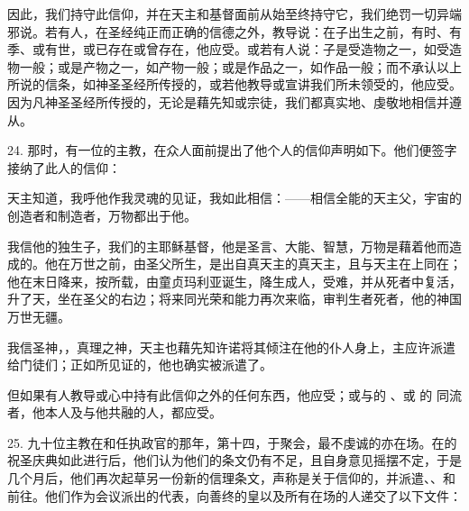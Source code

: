 因此，我们持守此信仰，并在天主和基督面前从始至终持守它，我们绝罚一切异端邪说。若有人，在圣经纯正而正确的信德之外，教导说：在子出生之前，有时、有季、或有世，或已存在或曾存在，他应受。或若有人说：子是受造物之一，如受造物一般；或是产物之一，如产物一般；或是作品之一，如作品一般；而不承认以上所说的信条，如神圣圣经所传授的，或若他教导或宣讲我们所未领受的，他应受。因为凡神圣圣经所传授的，无论是藉先知或宗徒，我们都真实地、虔敬地相信并遵从。\par

24. 那时，有一位的主教，在众人面前提出了他个人的信仰声明如下。他们便签字接纳了此人的信仰：\par

天主知道，我呼他作我灵魂的见证，我如此相信：——相信全能的天主父，宇宙的创造者和制造者，万物都出于他。\par

我信他的独生子，我们的主耶稣基督，他是圣言、大能、智慧，万物是藉着他而造成的。他在万世之前，由圣父所生，是出自真天主的真天主，且与天主在上同在；他在末日降来，按所载，由童贞玛利亚诞生，降生成人，受难，并从死者中复活，升了天，坐在圣父的右边；将来同光荣和能力再次来临，审判生者死者，他的神国万世无疆。\par

我信圣神，，真理之神，天主也藉先知许诺将其倾注在他的仆人身上，主应许派遣给门徒们；正如所见证的，他也确实被派遣了。\par

但如果有人教导或心中持有此信仰之外的任何东西，他应受；或与的 、或 的 同流者，他本人及与他共融的人，都应受。\par

25. 九十位主教在和任执政官的那年，第十四，于聚会，最不虔诚的亦在场。在的祝圣庆典如此进行后，他们认为他们的条文仍有不足，且自身意见摇摆不定，于是几个月后，他们再次起草另一份新的信理条文，声称是关于信仰的，并派遣、、和前往。他们作为会议派出的代表，向善终的皇以及所有在场的人递交了以下文件：\par

